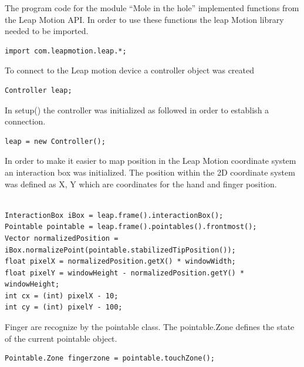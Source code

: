 The program code for the module “Mole in the hole” implemented functions from the Leap Motion API. In order to use these functions the leap Motion library needed to be imported.

\lstset{language=Java}
\begin{lstlisting}[caption = {Leap Motion library}, label={lst:Java}]
import com.leapmotion.leap.*;
\end{lstlisting}

To connect to the Leap motion device a controller object was created

\lstset{language=Java}
\begin{lstlisting}[caption = {The code for touch zone}, label={lst:Java}]
Controller leap;
\end{lstlisting}

In setup() the controller was initialized as followed in order to establish a connection.

\lstset{language=Java}
\begin{lstlisting}[caption = {The code for touch zone}, label={lst:Java}]
leap = new Controller();
\end{lstlisting}

In order to make it easier to map position in the Leap Motion coordinate system an interaction box was initialized. The position within the 2D coordinate system was defined as X, Y which are coordinates for the hand and finger position. 

\lstset{language=Java}
\begin{lstlisting}[caption = {The code for touch zone}, label={lst:Java}]

InteractionBox iBox = leap.frame().interactionBox();
Pointable pointable = leap.frame().pointables().frontmost();
Vector normalizedPosition = iBox.normalizePoint(pointable.stabilizedTipPosition());
float pixelX = normalizedPosition.getX() * windowWidth;
float pixelY = windowHeight - normalizedPosition.getY() * windowHeight;
int cx = (int) pixelX - 10;
int cy = (int) pixelY - 100;

\end{lstlisting}

Finger are recognize by the pointable class. The pointable.Zone defines the state of the current pointable object.

\lstset{language=Java}
\begin{lstlisting}[caption = {The code for touch zone}, label={lst:Java}]
 Pointable.Zone fingerzone = pointable.touchZone();
\end{lstlisting}

